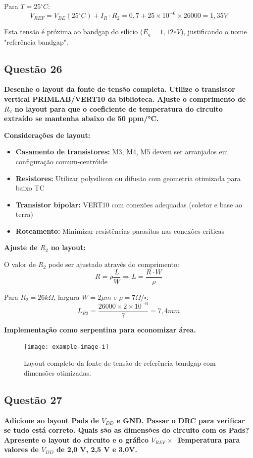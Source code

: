 ﻿\documentclass[12pt,a4paper]{article}
\newcommand{\degree}{\ensuremath{{}^\circ}}
\begin{document}
Para $T = 25\degree C$:
$$V_{REF} = V_{BE}(25\degree C) + I_R \cdot R_2 = 0,7 + 25 \times 10^{-6} \times 26000 = 1,35V$$

Esta tensão é próxima ao bandgap do silício ($E_g = 1,12eV$), justificando o nome "referência bandgap".

\subsection*{Questão 26}
\textbf{Desenhe o layout da fonte de tensão completa. Utilize o transistor vertical PRIMLAB/VERT10 da biblioteca. Ajuste o comprimento de $R_2$ no layout para que o coeficiente de temperatura do circuito extraído se mantenha abaixo de 50 ppm/°C.}

\textbf{Considerações de layout:}

\begin{itemize}
    \item \textbf{Casamento de transistores:} M3, M4, M5 devem ser arranjados em configuração comum-centróide
    \item \textbf{Resistores:} Utilizar polysilicon ou difusão com geometria otimizada para baixo TC
    \item \textbf{Transistor bipolar:} VERT10 com conexões adequadas (coletor e base ao terra)
    \item \textbf{Roteamento:} Minimizar resistências parasitas nas conexões críticas
\end{itemize}

\textbf{Ajuste de $R_2$ no layout:}

O valor de $R_2$ pode ser ajustado através do comprimento:
$$R = \rho \frac{L}{W} \Rightarrow L = \frac{R \cdot W}{\rho}$$

Para $R_2 = 26k\Omega$, largura $W = 2\mu m$ e $\rho = 7\Omega/\square$:
$$L_{R2} = \frac{26000 \times 2 \times 10^{-6}}{7} = 7,4mm$$

\textbf{Implementação como serpentina para economizar área.}

\begin{figure}[H]
\centering
\texttt{[image: example-image-i]}
\caption{Layout completo da fonte de tensão de referência bandgap com dimensões otimizadas.}
\label{fig:bandgap_layout}
\end{figure}

\subsection*{Questão 27}
\textbf{Adicione ao layout Pads de $V_{DD}$ e GND. Passar o DRC para verificar se tudo está correto. Quais são as dimensões do circuito com os Pads? Apresente o layout do circuito e o gráfico $V_{REF} \times$ Temperatura para valores de $V_{DD}$ de 2,0 V, 2,5 V e 3,0V.}
\end{document}
